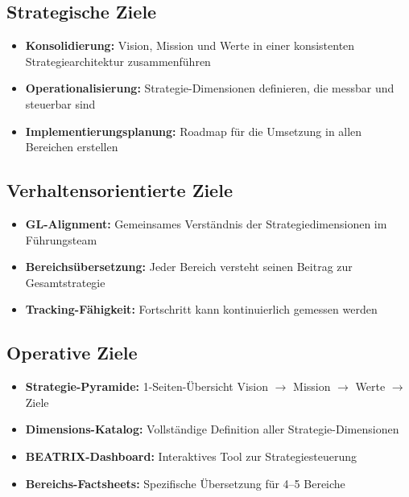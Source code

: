 \documentclass{fehradvice-report}
\begin{document}
\subsection{Strategische Ziele}

\begin{itemize}
    \item[$\checkmark$] \textbf{Konsolidierung:} Vision, Mission und Werte in einer konsistenten Strategiearchitektur zusammenführen
    \item[$\checkmark$] \textbf{Operationalisierung:} Strategie-Dimensionen definieren, die messbar und steuerbar sind
    \item[$\checkmark$] \textbf{Implementierungsplanung:} Roadmap für die Umsetzung in allen Bereichen erstellen
\end{itemize}

\subsection{Verhaltensorientierte Ziele}

\begin{itemize}
    \item[$\checkmark$] \textbf{GL-Alignment:} Gemeinsames Verständnis der Strategiedimensionen im Führungsteam
    \item[$\checkmark$] \textbf{Bereichsübersetzung:} Jeder Bereich versteht seinen Beitrag zur Gesamtstrategie
    \item[$\checkmark$] \textbf{Tracking-Fähigkeit:} Fortschritt kann kontinuierlich gemessen werden
\end{itemize}

\subsection{Operative Ziele}

\begin{itemize}
    \item[$\checkmark$] \textbf{Strategie-Pyramide:} 1-Seiten-Übersicht Vision $\to$ Mission $\to$ Werte $\to$ Ziele
    \item[$\checkmark$] \textbf{Dimensions-Katalog:} Vollständige Definition aller Strategie-Dimensionen
    \item[$\checkmark$] \textbf{BEATRIX-Dashboard:} Interaktives Tool zur Strategiesteuerung
    \item[$\checkmark$] \textbf{Bereichs-Factsheets:} Spezifische Übersetzung für 4--5 Bereiche
\end{itemize}
\end{document}
